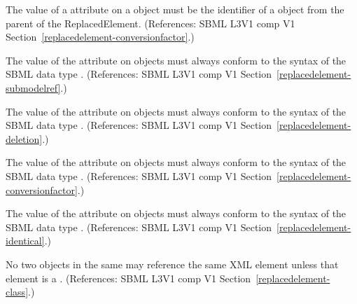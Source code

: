 \begin{sbmlenum}
 { The value of a  attribute on a
  \ReplacedElement object must be the identifier of a \Parameter object
  from the parent \Model of the ReplacedElement.  
  (References: SBML L3V1 comp V1 Section~\ref{replacedelement-conversionfactor}.) }


 { The value of the  attribute on
  \ReplacedElement objects must always conform to the syntax of
  the SBML data type .
  (References: SBML L3V1 comp V1 Section~\ref{replacedelement-submodelref}.) }
  

 { The value of the  attribute on
  \ReplacedElement objects must always conform to the syntax of
  the SBML data type .
  (References: SBML L3V1 comp V1 Section~\ref{replacedelement-deletion}.) }
  

 { The value of the  attribute on
  \ReplacedElement objects must always conform to the syntax of
  the SBML data type .
  (References: SBML L3V1 comp V1 Section~\ref{replacedelement-conversionfactor}.) }
  

 { The value of the  attribute on
  \ReplacedElement objects must always conform to the syntax of
  the SBML data type .
  (References: SBML L3V1 comp V1 Section~\ref{replacedelement-identical}.) }


 { No two \ReplacedElement objects in the same \Model
  may reference the same XML element unless that element is a \Deletion.
  (References: SBML L3V1 comp V1 Section~\ref{replacedelement-class}.) }

\end{sbmlenum}
